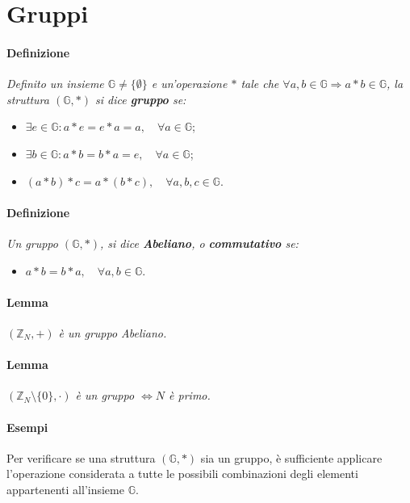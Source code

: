 \documentclass[a4paper]{report}
\begin{document}
\section{Gruppi}
\paragraph{Definizione} \textit{Definito un insieme $\mathbb{G} \neq \{\emptyset\}$ e un'operazione $*$ tale che $\forall a,b \in \mathbb{G}\Rightarrow a*b\in \mathbb{G}$, la struttura $(\mathbb{G},*)$ si dice \textbf{gruppo} se:}
\begin{itemize}
\item $\exists e \in \mathbb{G}: a*e=e*a=a,\quad \forall a \in \mathbb{G}$;
\item $\exists b \in \mathbb{G}: a*b=b*a=e,\quad \forall a \in \mathbb{G}$;
\item $(a*b)*c = a*(b*c), \quad \forall a,b,c \in \mathbb{G}$.
\end{itemize}
\paragraph{Definizione} \textit{Un gruppo $(\mathbb{G},*)$, si dice \textbf{Abeliano}, o \textbf{commutativo} se:}
\begin{itemize}
\item $a*b=b*a, \quad \forall a,b\in \mathbb{G}$. 
\end{itemize}
\paragraph{Lemma}\textit{$(\mathbb{Z}_N,+)$ è un gruppo Abeliano.}
\paragraph{Lemma}\textit{$(\mathbb{Z}_N\setminus \{ 0\},\cdot )$ è un gruppo $\Leftrightarrow N$ è primo. }
\paragraph{Esempi} Per verificare se una struttura $(\mathbb{G},*)$ sia un gruppo, è sufficiente applicare l'operazione considerata a tutte le possibili combinazioni degli elementi appartenenti all'insieme $\mathbb{G}$.
\end{document}
